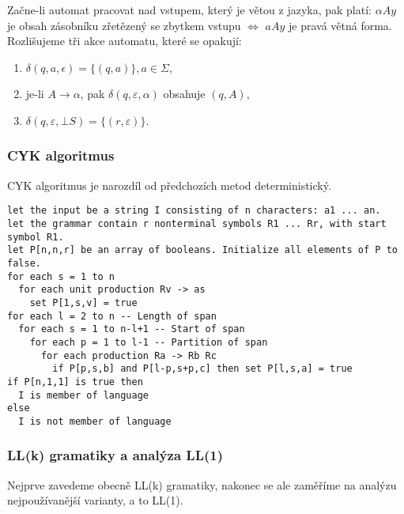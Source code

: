 Začne-li automat pracovat nad vstupem, který je větou z jazyka, pak
platí: $\alpha A y$ je obsah zásobníku zřetězený se zbytkem vstupu
$\iff$ $a A y$ je pravá větná forma. Rozlišujeme tři akce automatu,
které se opakují:
\begin{enumerate}
    \item $\delta(q, a, \epsilon) = \{ (q, a) \}, a \in \Sigma$,
    \item je-li $A \to \alpha$, pak $\delta(q, \varepsilon, \alpha)$
        obsahuje $(q, A)$,
    \item $\delta(q, \varepsilon, \bot S) = \{ (r, \varepsilon) \}$.
\end{enumerate}

\begin{example}
\end{example}


\subsubsection{CYK algoritmus}

CYK algoritmus je narozdíl od předchozích metod deterministický.

\begin{Verbatim}[fontsize=\small]
let the input be a string I consisting of n characters: a1 ... an.
let the grammar contain r nonterminal symbols R1 ... Rr, with start symbol R1.
let P[n,n,r] be an array of booleans. Initialize all elements of P to false.
for each s = 1 to n
  for each unit production Rv -> as
    set P[1,s,v] = true
for each l = 2 to n -- Length of span
  for each s = 1 to n-l+1 -- Start of span
    for each p = 1 to l-1 -- Partition of span
      for each production Ra -> Rb Rc
        if P[p,s,b] and P[l-p,s+p,c] then set P[l,s,a] = true
if P[n,1,1] is true then
  I is member of language
else
  I is not member of language
\end{Verbatim}

\subsubsection{LL(k) gramatiky a analýza LL(1)}


Nejprve zavedeme obecně LL(k) gramatiky, nakonec se ale zaměříme na
analýzu nejpoužívanější varianty, a to LL(1).

